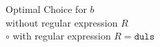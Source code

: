 \begin{figure}[tbh]
\caption{Optimal Choice for $b$\\\textbullet without regular expression $R$\\$\circ$ with regular expression $R=\mathtt{duls}$}\label{fig:choiceb}
\end{figure}

% 	      
% 	
